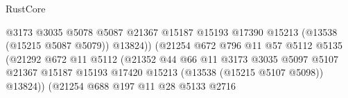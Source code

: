 \begin{lexlean}{RustCore}
\begin{coremodule}
                                                    @3173
                                                    @3035
                                                    @5078
                                                    @5087
                                                    @21367
                                                    @15187
                                                    @15193
                                                    @17390
                                                    @15213
                                                    (@13538 (@15215 @5087 @5079))
                                                    @13824))
                                                (@21254
                                                  @672
                                                  @796
                                                  @11
                                                  @57
                                                  @5112
                                                  @5135
                                                  (@21292
                                                    @672
                                                    @11
                                                    @5112
                                                    (@21352
                                                      @44
                                                      @66
                                                      @11
                                                      @3173
                                                      @3035
                                                      @5097
                                                      @5107
                                                      @21367
                                                      @15187
                                                      @15193
                                                      @17420
                                                      @15213
                                                      (@13538 (@15215 @5107 @5098))
                                                      @13824))
                                                  (@21254
                                                    @688
                                                    @197
                                                    @11
                                                    @28
                                                    @5133
                                                    @2716

\end{coremodule}
\end{lexlean}
